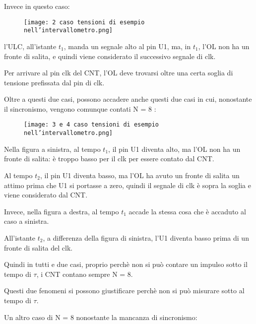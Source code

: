 Invece in questo caso: 

\begin{figure}[h]
    \centering
    \texttt{[image: 2 caso tensioni di esempio nell'intervallometro.png]}
\end{figure}

l'ULC, all'istante $t_1$, manda un segnale alto al pin U1, ma, in $t_1$, 
l'OL non ha un fronte di salita, e quindi viene considerato il successivo segnale di clk. \newline 

Per arrivare al pin clk del CNT, l'OL deve trovarsi oltre una certa soglia di tensione prefissata dal pin di clk. \newline 

Oltre a questi due casi, possono accadere anche questi due casi in cui, nonostante il sincronismo, 
vengono comunque contati N = 8 : 

\begin{figure}[h]
    \centering
    \texttt{[image: 3 e 4 caso tensioni di esempio nell'intervallometro.png]}
\end{figure}

\newpage 

Nella figura a sinistra, al tempo $t_1$, il pin U1 diventa alto, ma l'OL non ha un fronte di salita: 
è troppo basso per il clk per essere contato dal CNT. \newline 

Al tempo $t_2$, il pin U1 diventa basso, ma l'OL ha avuto un fronte di salita un attimo prima che U1 si portasse a zero, 
quindi il segnale di clk è sopra la soglia e viene considerato dal CNT. \newline

Invece, nella figura a destra, al tempo $t_1$ accade la stessa cosa che è accaduto al caso a sinistra. \newline 

All'istante $t_2$, a differenza della figura di sinistra, l'U1 diventa basso prima di un fronte di salita del clk. \newline 

Quindi in tutti e due casi, proprio perchè non si può contare un impulso sotto il tempo di $\tau$, i CNT contano sempre N = 8. \newline 

Questi due fenomeni  si possono giustificare perchè non si può misurare sotto al tempo di $\tau$. \newline 

Un altro caso di N = 8 nonostante la mancanza di sincronismo: 

